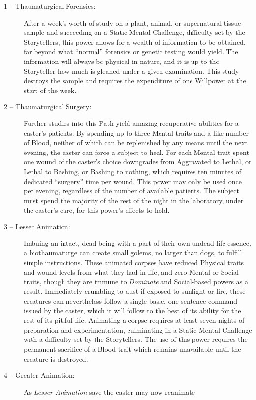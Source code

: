 \begin{description}
	\item[1 -- Thaumaturgical Forensics:]  After a week's worth of study on a plant, animal, or 
	supernatural tissue sample and succeeding on a Static Mental Challenge, difficulty set by the 
	Storytellers, this power allows for a wealth of information to be obtained, far beyond what 
	``normal'' forensics or genetic testing would yield.  The information will always be physical 
	in nature, and it is up to the Storyteller how much is gleaned under a given examination.  
	This study destroys the sample and requires the expenditure of one Willpower at the start of the 
	week.
	\item[2 -- Thaumaturgical Surgery:]  Further studies into this Path yield amazing recuperative 
	abilities for a caster's patients.  By spending up to three Mental traits and a like number of 
	Blood, neither of which can be replenished by any means until the next evening, the caster can 
	force a subject to heal.  For each Mental trait spent one wound of the caster's choice downgrades 
	from Aggravated to Lethal, or Lethal to Bashing, or Bashing to nothing, which requires ten minutes 
	of dedicated ``surgery'' time per wound.  This power may only be used once per evening, regardless 
	of the number of available patients.  The subject must spend the majority of the rest of the night 
	in the laboratory, under the caster's care, for this power's effects to hold.
	\item[3 -- Lesser Animation:]  Imbuing an intact, dead being with a part of their own undead life 
	essence, a biothaumaturge can create small golems, no larger than dogs, to fulfill simple 
	instructions.  These animated corpses have reduced Physical traits and wound levels from what they 
	had in life, and zero Mental or Social traits, though they are immune to \emph{Dominate} and 
	Social-based powers as a result.  Immediately crumbling to dust if exposed to sunlight or fire, 
	these creatures can nevertheless follow a single basic, one-sentence command issued by the caster, 
	which it will follow to the best of its ability for the rest of its pitiful life.  Animating a 
	corpse requires at least seven nights of preparation and experimentation, culminating in a 
	Static Mental Challenge with a difficulty set by the Storytellers.  The use of this power requires 
	the permanent sacrifice of a Blood trait which remains unavailable until the creature is destroyed.
	\item[4 -- Greater Animation:]  As \emph{Lesser Animation} save the caster may now reanimate 

\end{description}
